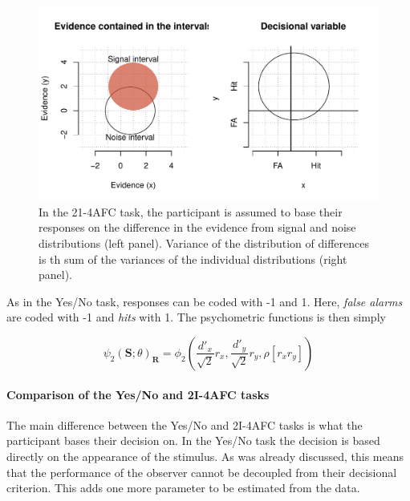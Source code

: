 \documentclass{article}\usepackage{knitr}
\begin{document}
\begin{figure}
\centering
\begin{knitrout}
\color{fgcolor}
\includegraphics[width=\maxwidth]{figure/unnamed-chunk-9-1} 

\end{knitrout}
\caption{In the 21-4AFC task, the participant is assumed to base their responses on the difference in the evidence from signal and noise distributions (left panel). Variance of the distribution of differences is th sum of the variances of the individual distributions (right panel).}
\label{fig:2I4AFC}
\end{figure}

As in the Yes/No task, responses can be coded with -1 and 1. Here, \textit{false alarms} are coded with -1 and \textit{hits} with 1.  The psychometric functions is then simply

\begin{equation}
\psi_2(\bm{S}; \theta)_{\bm{R}} = \phi_2(\frac{d'_x}{\sqrt{2}}r_x, \frac{d'_y}{\sqrt{2}} r_y, \rho [r_x r_y])
\label{eq:generalPfun2}
\end{equation}

\paragraph{Comparison of the Yes/No and 2I-4AFC tasks}

The main difference between the Yes/No and 2I-4AFC tasks is what the participant bases their decision on. In the Yes/No task the decision is based directly on the appearance of the stimulus. As was already discussed, this means that the performance of the observer cannot be decoupled from their decisional criterion. This adds one more parameter to be estimated from the data. 
\end{document}
